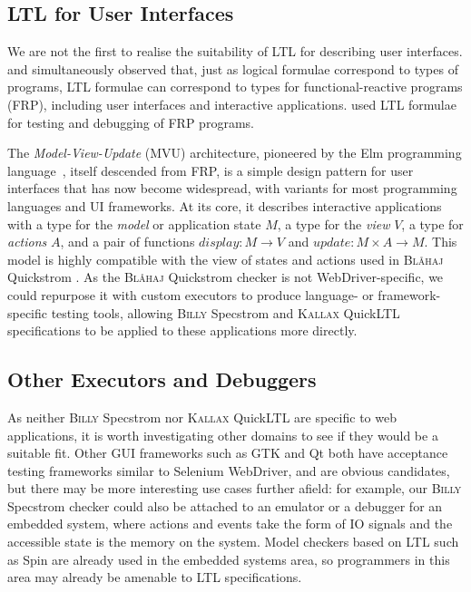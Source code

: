 \documentclass[sigplan,nonacm,10pt]{acmart}
\makeatletter
\newcommand{\Quickstrom}[0]{%
  \if@ACM@anonymous%
  \textsc{Bl\aa{}haj}%
  \else%
  Quickstrom%
  \fi\xspace}
\newcommand{\Specstrom}[0]{%
  \if@ACM@anonymous%
  \textsc{Billy}%
  \else%
  Specstrom%
  \fi\xspace}
\newcommand{\QuickLTL}[0]{%
    \if@ACM@anonymous%
    \textsc{Kallax}%
    \else%
    QuickLTL%
    \fi\xspace}
\makeatother
\begin{document}
\subsection{LTL for User Interfaces}
We are not the first to realise the suitability of LTL for describing user interfaces. \citet{ltltypesfrp} and \citet{jeltsch} simultaneously observed that, just as
logical formulae correspond to types of programs, LTL formulae can correspond to types for functional-reactive programs (FRP), including user interfaces and interactive applications. \citet{debuggingfrp}
used LTL formulae for testing and debugging of FRP programs.

The \emph{Model-View-Update} (MVU) architecture, pioneered by the Elm programming language~\citep{elm}, itself descended from FRP, is a simple design pattern for user interfaces that has now
become widespread, with variants for most programming languages and UI frameworks. At its core, it describes interactive applications with a type for the \emph{model} or application state $M$,
a type for the \emph{view} $V$, a type for \emph{actions} $A$, and a pair of functions $\mathit{display} : M \rightarrow V$ and $\mathit{update} : M \times A \rightarrow M$.
This model is highly compatible with the view of states and actions used in \Quickstrom.
As the \Quickstrom checker is not WebDriver-specific, we could repurpose it with custom executors to produce language- or framework-specific testing tools, allowing
\Specstrom and \QuickLTL specifications to be applied to these applications more directly.

\subsection{Other Executors and Debuggers} As neither \Specstrom nor \QuickLTL are specific to web applications, it is worth investigating other domains to see if they would be a
suitable fit. Other GUI frameworks such as GTK and Qt both have acceptance testing frameworks similar to Selenium WebDriver, and are obvious candidates, but there may be more interesting
use cases further afield: for example, our \Specstrom checker could also be attached to an emulator or a debugger for an embedded system, where actions and events take the form of IO signals and the
accessible state is the memory on the system. Model checkers based on LTL such as Spin are already used in the embedded systems area, so programmers in this area may already be amenable to LTL specifications.
\end{document}
